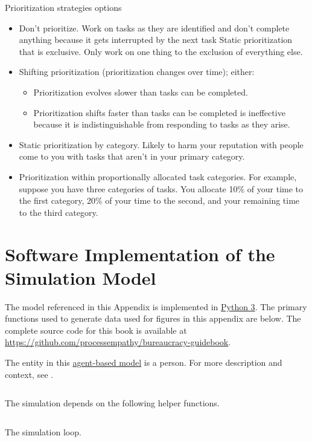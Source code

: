 Prioritization strategies options
\begin{itemize}
    \item Don't prioritize. Work on tasks as they are identified and don't complete anything because it gets interrupted by the next task
Static prioritization that is exclusive. Only work on one thing to the exclusion of everything else.
    \item Shifting prioritization (prioritization changes over time); either:
    \begin{itemize}
        \item Prioritization evolves slower than tasks can be completed.
        \item Prioritization shifts faster than tasks can be completed is ineffective because it is indistinguishable from responding to tasks as they arise.
    \end{itemize}
    \item Static prioritization by category. Likely to harm your reputation with people come to you with tasks that aren't in your primary category.
    \item Prioritization within proportionally allocated task categories. For example, suppose you have three categories of tasks. You allocate 10\% of your time to the first category, 20\% of your time to the second, and your remaining time to  the third category. 
\end{itemize}

\clearpage
\section{Software Implementation of the Simulation Model}

The model referenced in this Appendix is implemented in \href{https://en.wikipedia.org/wiki/Python_(programming_language)}{Python 3}. The primary functions used to generate data used for figures in this appendix are below. The complete source code for this book is available at \href{https://github.com/processempathy/bureaucracy-guidebook}{https://github.com/processempathy/bureaucracy-guidebook}.

The entity in this
\href{https://en.wikipedia.org/wiki/Agent-based_model}{agent-based model} is a person. For more description and context, see 
\iftoggle{haspagenumbers}{page~\pageref{sec:example-people}}{section~\ref{sec:example-people}}.
\inputminted[fontsize=\footnotesize,linenos]{python}{python3_lib_simulation__create_person.py}

The simulation depends on the following helper functions.
\inputminted[fontsize=\footnotesize,linenos]{python}{python3_lib_simulation__helper_functions.py}

\begin{landscape}
The simulation loop.
\inputminted[fontsize=\footnotesize,linenos]{python}{python3_lib_simulation__simulate.py}
\end{landscape}
